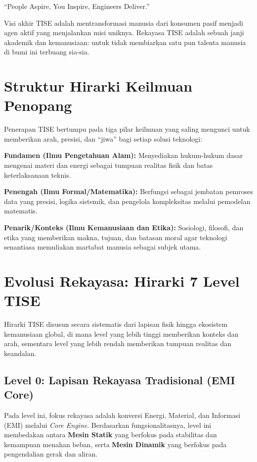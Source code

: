 \documentclass[
  letterpaper,
  DIV=11,
  numbers=noendperiod]{scrreprt}
\begin{document}
``People Aspire, You Inspire, Engineers Deliver.''

Visi akhir TISE adalah mentransformasi manusia dari konsumen pasif
menjadi agen aktif yang menjalankan misi uniknya. Rekayasa TISE adalah
sebuah janji akademik dan kemanusiaan: untuk tidak membiarkan satu pun
talenta manusia di bumi ini terbuang sia-sia.

\section{Struktur Hirarki Keilmuan
Penopang}\label{struktur-hirarki-keilmuan-penopang}

Penerapan TISE bertumpu pada tiga pilar keilmuan yang saling mengunci
untuk memberikan arah, presisi, dan ``jiwa'' bagi setiap solusi
teknologi:

\textbf{Fundamen (Ilmu Pengetahuan Alam):} Menyediakan hukum-hukum dasar
mengenai materi dan energi sebagai tumpuan realitas fisik dan batas
keterlaksanaan teknis.

\textbf{Penengah (Ilmu Formal/Matematika):} Berfungsi sebagai jembatan
pemroses data yang presisi, logika sistemik, dan pengelola kompleksitas
melalui pemodelan matematis.

\textbf{Penarik/Konteks (Ilmu Kemanusiaan dan Etika):} Sosiologi,
filosofi, dan etika yang memberikan makna, tujuan, dan batasan moral
agar teknologi senantiasa memuliakan martabat manusia sebagai subjek
utama.

\section{Evolusi Rekayasa: Hirarki 7 Level
TISE}\label{evolusi-rekayasa-hirarki-7-level-tise}

Hirarki TISE disusun secara sistematis dari lapisan fisik hingga
ekosistem kemanusiaan global, di mana level yang lebih tinggi memberikan
konteks dan arah, sementara level yang lebih rendah memberikan tumpuan
realitas dan keandalan.

\subsection{Level 0: Lapisan Rekayasa Tradisional (EMI
Core)}\label{level-0-lapisan-rekayasa-tradisional-emi-core}

Pada level ini, fokus rekayasa adalah konversi Energi, Material, dan
Informasi (EMI) melalui \emph{Core Engine}. Berdasarkan
fungsionalitasnya, level ini membedakan antara \textbf{Mesin Statik}
yang berfokus pada stabilitas dan kemampuan menahan beban, serta
\textbf{Mesin Dinamik} yang berfokus pada pengendalian gerak dan aliran.
\end{document}
